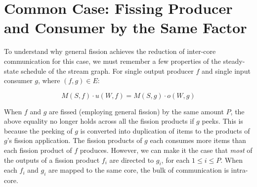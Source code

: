 \section{Common Case: Fissing Producer and Consumer by the Same Factor}



To understand why general fission achieves the reduction of inter-core
communication for this case, we must remember a few properties of the
steady-state schedule of the stream graph.  For single output producer
$f$ and single input consumer $g$, where $(f,g) \in E$:

\[ M(S, f) \cdot u(W, f) = M(S,g) \cdot o(W,g) \]

\noindent When $f$ and $g$ are fissed (employing general fission) by
the same amount $P$, the above equality no longer holds across all the
fission products if $g$ peeks.  This is because the peeking of $g$ is
converted into duplication of items to the products of $g$'s fission
application.  The fission products of $g$ each consumes more items
than each fission product of $f$ produces.  However, we can make it
the case that {\it most} of the outputs of a fission product $f_i$ are
directed to $g_i$, for each $1 \le i \le P$.  When each $f_i$ and
$g_i$ are mapped to the same core, the bulk of communication is
intra-core.

